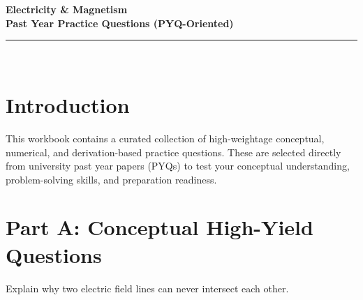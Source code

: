 \documentclass[11pt,a4paper]{article}
\begin{document}
\begin{center}
    \vspace*{1cm}
    {\Huge\bfseries\color{RoyalBlue} Electricity \& Magnetism}\\[0.4cm]
    {\Large\bfseries\color{Eggplant} Past Year Practice Questions (PYQ-Oriented)}\\[0.6cm]
    \rule{\linewidth}{1.5pt}\\[1.0cm]
\end{center}

\section{Introduction}
This workbook contains a curated collection of high-weightage conceptual, numerical, and derivation-based practice questions. These are selected directly from university past year papers (PYQs) to test your conceptual understanding, problem-solving skills, and preparation readiness.

\newpage
\section{Part A: Conceptual High-Yield Questions}

\begin{questionbox}
    Explain why two electric field lines can never intersect each other.
\end{questionbox}
\end{document}
